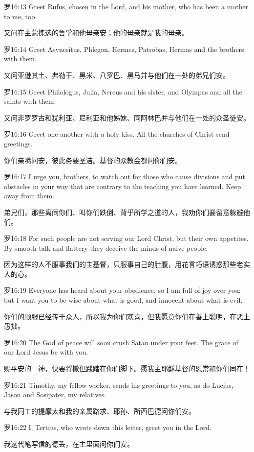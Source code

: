 \documentclass[a4paper,11pt,onecolumn,twoside]{ctexart}
\begin{document}
\begin{multicols}{2}
 罗16:13
 Greet Rufus, chosen in the Lord, and his mother, who has been a mother to me, too.

 又问在主蒙拣选的鲁孚和他母亲安；他的母亲就是我的母亲。


 罗16:14
 Greet Asyncritus, Phlegon, Hermes, Patrobas, Hermas and the brothers with them.

 又问亚逊其土、弗勒干、黑米、八罗巴、黑马并与他们在一处的弟兄们安。


 罗16:15
 Greet Philologus, Julia, Nereus and his sister, and Olympas and all the saints with them.

 又问非罗罗古和犹利亚、尼利亚和他姊妹、同阿林巴并与他们在一处的众圣徒安。


 罗16:16
 Greet one another with a holy kiss. All the churches of Christ send greetings.

 你们亲嘴问安，彼此务要圣洁。基督的众教会都问你们安。


 罗16:17
 I urge you, brothers, to watch out for those who cause divisions and put obstacles in your way that are contrary to the teaching you have learned. Keep away from them.

 弟兄们，那些离间你们、叫你们跌倒、背乎所学之道的人，我劝你们要留意躲避他们。


 罗16:18
 For such people are not serving our Lord Christ, but their own appetites. By smooth talk and flattery they deceive the minds of naive people.

 因为这样的人不服事我们的主基督，只服事自己的肚腹，用花言巧语诱惑那些老实人的心。


 罗16:19
 Everyone has heard about your obedience, so I am full of joy over you; but I want you to be wise about what is good, and innocent about what is evil.

 你们的顺服已经传于众人，所以我为你们欢喜，但我愿意你们在善上聪明，在恶上愚拙。


 罗16:20
 The God of peace will soon crush Satan under your feet. The grace of our Lord Jesus be with you.

 赐平安的　神，快要将撒但践踏在你们脚下。愿我主耶稣基督的恩常和你们同在！


 罗16:21
 Timothy, my fellow worker, sends his greetings to you, as do Lucius, Jason and Sosipater, my relatives.

 与我同工的提摩太和我的亲属路求、耶孙、所西巴德问你们安。


 罗16:22
 I, Tertius, who wrote down this letter, greet you in the Lord.

 我这代笔写信的德丢，在主里面问你们安。



\end{multicols}
\end{document}
